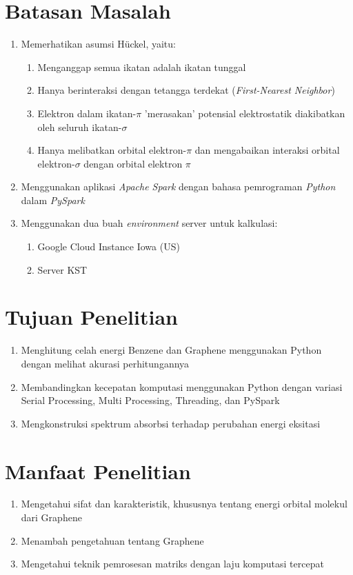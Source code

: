 \documentclass[12pt,a4paper]{report}
\begin{document}
	\section{Batasan Masalah}
	\begin{enumerate}
		\item Memerhatikan asumsi Hückel, yaitu:
		\begin{enumerate}
			\item Menganggap semua ikatan adalah ikatan tunggal
			\item Hanya berinteraksi dengan tetangga terdekat (\textit{First-Nearest Neighbor})
			\item Elektron dalam ikatan-$\pi$ 'merasakan' potensial elektrostatik diakibatkan oleh seluruh ikatan-$\sigma$
			\item Hanya melibatkan orbital elektron-$\pi$ dan mengabaikan interaksi orbital elektron-$\sigma$ dengan orbital elektron $\pi$
		\end{enumerate}
		\item Menggunakan aplikasi \textit{Apache Spark} dengan bahasa pemrograman \textit{Python} dalam \textit{PySpark}
		\item Menggunakan dua buah \textit{environment} server untuk kalkulasi:
		\begin{enumerate}
			\item Google Cloud Instance Iowa (US)
			\item Server KST
		\end{enumerate}
	\end{enumerate}

	\section{Tujuan Penelitian}
	\begin{enumerate}
		\item Menghitung celah energi Benzene dan Graphene menggunakan Python dengan melihat akurasi perhitungannya
		\item Membandingkan kecepatan komputasi menggunakan Python dengan variasi Serial Processing, Multi Processing, Threading, dan PySpark
		\item Mengkonstruksi spektrum absorbsi terhadap perubahan energi eksitasi
	\end{enumerate}

	\section{Manfaat Penelitian}
	\begin{enumerate}
		\item Mengetahui sifat dan karakteristik, khususnya tentang energi orbital molekul dari Graphene
		\item Menambah pengetahuan tentang Graphene
		\item Mengetahui teknik pemrosesan matriks dengan laju komputasi tercepat
	\end{enumerate}
\end{document}
